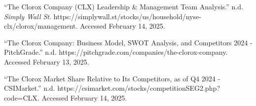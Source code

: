 \documentclass[
  letterpaper,
  DIV=11,
  numbers=noendperiod]{scrartcl}
\newlength{\cslhangindent}
\newenvironment{CSLReferences}[2] %
 {\begin{list}{}{%
  \setlength{\itemindent}{0pt}
  \setlength{\leftmargin}{0pt}
  \setlength{\parsep}{0pt}
  \ifodd #1
   \setlength{\leftmargin}{\cslhangindent}
   \setlength{\itemindent}{-1\cslhangindent}
  \fi
  \setlength{\itemsep}{#2\baselineskip}}}
 {\end{list}}
\begin{document}
\begin{CSLReferences}{1}{0}
{``The {Clorox Company} ({CLX}) {Leadership} \& {Management Team
Analysis}.''} n.d. \emph{Simply Wall St}.
https://simplywall.st/stocks/us/household/nyse-clx/clorox/management.
Accessed February 14, 2025.

{``The {Clorox Company}: {Business Model}, {SWOT Analysis}, and
{Competitors} 2024 - {PitchGrade}.''} n.d.
https://pitchgrade.com/companies/the-clorox-company. Accessed February
13, 2025.

{``The {Clorox Market} Share Relative to Its Competitors, as of {Q4}
2024 - {CSIMarket}.''} n.d.
https://csimarket.com/stocks/competitionSEG2.php?code=CLX. Accessed
February 14, 2025.

\end{CSLReferences}
\end{document}
